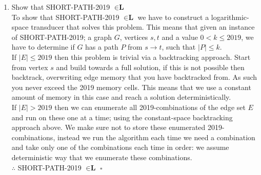 \documentclass[12pt]{article}
\begin{document}
\begin{enumerate}
\begin{enumerate}
\item Show that SHORT-PATH-2019 $\in \textbf{L}$ \\
To show that SHORT-PATH-2019 $\in \textbf{L}$ we have to construct a logarithmic-space transducer that solves this problem. This means that given an instance of SHORT-PATH-2019; a graph $G$, vertices $s,t$ and a value $0<k\leq 2019$, we have to determine if $G$ has a path $P$ from $s\rightarrow t$, such that $|P|\leq k$. \\
If $|E|\leq 2019$ then this problem is trivial via a backtracking approach. Start from vertex $s$ and build towards a full solution, if this is not possible then backtrack, overwriting edge memory that you have backtracked from. As such you never exceed the 2019 memory cells. This means that we use a constant amount of memory in this case and reach a solution deterministically. \\
If $|E|>2019$ then we can enumerate all 2019-combinations of the edge set $E$ and run on these one at a time; using the constant-space backtracking approach above. We make sure not to store these enumerated 2019-combinations, instead we run the algorithm each time we need a combination and take only one of the combinations each time in order: we assume deterministic way that we enumerate these combinations.\\
$\therefore $ SHORT-PATH-2019 $\in \textbf{L}$ $\square$


\end{enumerate}
\end{enumerate}
\end{document}
